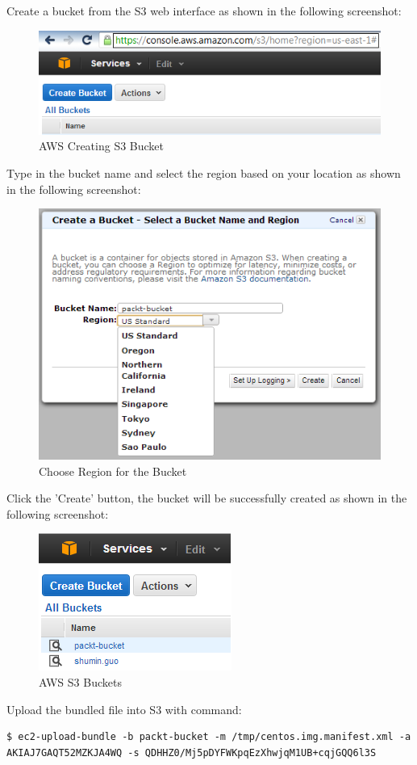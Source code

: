 Create a bucket from the S3 web interface as shown in the following screenshot:
\begin{figure}[ht]
  \centering
  \includegraphics[width=.8\textwidth]{figs/5163os_08_17.png}
  \caption{AWS Creating S3 Bucket}\label{fig:aws.s3.bucket.create}
\end{figure} 
Type in the bucket name and select the region based on your location as shown in the following screenshot:
\begin{figure}[ht]
  \centering
  \includegraphics[width=.8\textwidth]{figs/5163os_08_18.png}
  \caption{Choose Region for the Bucket}\label{fig:aws.s3.bucket.region}
\end{figure} 
Click the 'Create' button, the bucket will be successfully created as shown in the following screenshot:
\begin{figure}[ht]
  \centering
  \includegraphics[width=.50\textwidth]{figs/5163os_08_19.png}
  \caption{AWS S3 Buckets}\label{fig:aws.s3.buckets}
\end{figure} 
Upload the bundled file into S3 with command:
\lstset{style=bashstyle}
\begin{lstlisting}
$ ec2-upload-bundle -b packt-bucket -m /tmp/centos.img.manifest.xml -a AKIAJ7GAQT52MZKJA4WQ -s QDHHZ0/Mj5pDYFWKpqEzXhwjqM1UB+cqjGQQ6l3S
\end{lstlisting}

